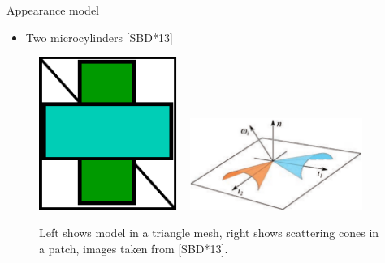 \documentclass{beamer}
\begin{document}
\begin{frame}{Appearance model}
\begin{itemize}
\setlength\itemsep{0.5em}
\item Two microcylinders [SBD*13]
\end{itemize}
\begin{center}
\begin{figure}
\includegraphics[width=0.4\textwidth]{img/cloth_model}
~
\includegraphics[width=0.5\textwidth]{img/microcylinders}
\caption*{\tiny{Left shows model in a triangle mesh, right shows scattering cones in a patch, images taken from [SBD*13].}}
\end{figure}
\end{center}
\end{frame}
\end{document}
